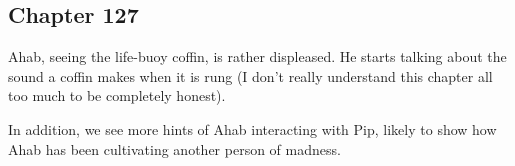 \subsection{Chapter 127}

Ahab, seeing the life-buoy coffin, is rather displeased. He starts talking
about the sound a coffin makes when it is rung (I don't really understand this
chapter all too much to be completely honest).

In addition, we see more hints of Ahab interacting with Pip, likely to show how
Ahab has been cultivating another person of madness.
